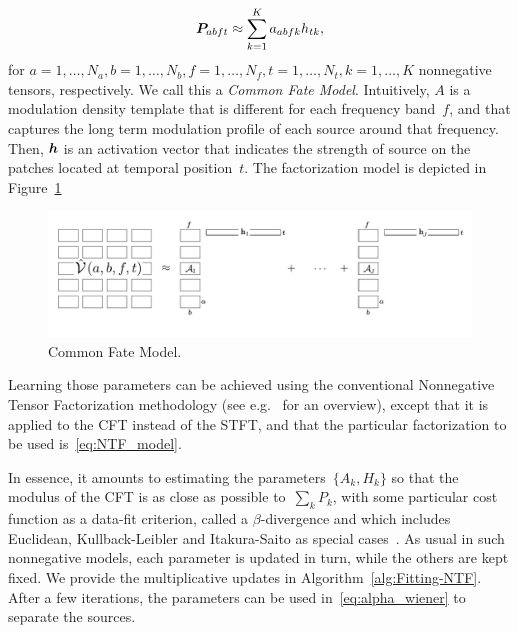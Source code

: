 \begin{equation}
{\bm{P}}_{abft} \approx \sum_{k=1}^{K}a_{abfk}h_{tk},\label{eq:NTF_model}
\end{equation}
for  $a = 1 , \ldots , N_a, b = 1 , \ldots , N_b, f = 1 , \ldots , N_f , t = 1 , \ldots , N_t , k = 1 , \ldots , K$
nonnegative tensors, respectively. We call this a \emph{Common Fate
Model}. Intuitively, $A$ is a modulation density template that
is different for each frequency band~$f$, and that captures the
long term modulation profile of each source around that frequency.
Then, ${\bm{h}}$ is an activation vector that indicates the strength
of source on the patches located at temporal position~$t$.
The factorization model is depicted in Figure~\ref{fig:cfm}

\begin{figure}[h!]
\centering
\includegraphics[width=0.66\columnwidth]{Chapters/06_Separation_Unknown/figures/cfm.pdf}
\caption{Common Fate Model.}
\label{fig:cfm}
\end{figure}




Learning those parameters can be achieved using the conventional Nonnegative
Tensor Factorization methodology (see e.g.~\cite{cichoki09,ozerov12,smaragdis14}
for an overview), except that it is applied to the CFT instead of the STFT,
and that the particular factorization to be used is~\eqref{eq:NTF_model}.

In essence, it amounts to estimating the parameters~$\{ A_{k},H_{k}\} $
so that the modulus of the CFT is
as close as possible to~$\sum_{k}P_{k}$, with some particular
cost function as a data-fit criterion, called a $\beta$-divergence
and which includes Euclidean, Kullback-Leibler and Itakura-Saito as
special cases~\cite{fitzgerald08a}. As usual in such nonnegative models,
each parameter is updated in turn, while the others are kept fixed.
We provide the multiplicative updates in Algorithm~\ref{alg:Fitting-NTF}.
After a few iterations, the parameters can be used in~\eqref{eq:alpha_wiener} to separate
the sources.

